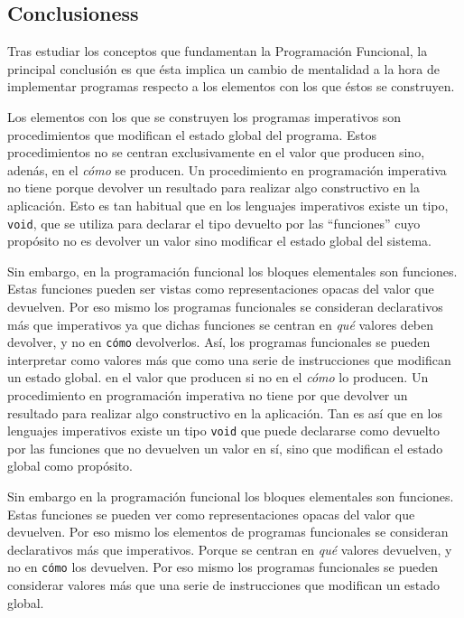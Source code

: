 \documentclass[../main.tex]{subfiles}
\begin{document}
\subsection{Conclusioness}
Tras estudiar los conceptos que fundamentan la Programación Funcional, la principal
conclusión es que ésta implica un cambio de mentalidad a la hora de implementar programas
respecto a los elementos con los que éstos se construyen.

Los elementos con los que se construyen los programas imperativos son procedimientos
que modifican el estado global del programa. Estos procedimientos no se centran exclusivamente
en el valor que producen sino, adenás, en el \textit{cómo} se producen. Un procedimiento en programación
imperativa no tiene porque devolver un resultado para realizar algo constructivo en la aplicación.
Esto es tan habitual que en los lenguajes imperativos existe un tipo, \texttt{void}, que se utiliza
para declarar el tipo devuelto por las ``funciones'' cuyo propósito no es devolver un valor sino  
modificar el estado global del sistema.

Sin embargo, en la programación funcional los bloques elementales son funciones. Estas
funciones pueden ser vistas como representaciones opacas del valor que devuelven. Por eso
mismo los programas funcionales se consideran declarativos más que imperativos ya que
dichas funciones se centran en \textit{qué} valores deben devolver, y no en \texttt{cómo} 
devolverlos. Así, los programas funcionales se pueden interpretar como valores más que como 
una serie de instrucciones que modifican un estado global.
en el valor que producen si no en el \textit{cómo} lo producen. Un procedimiento en programación
imperativa no tiene por que devolver un resultado para realizar algo constructivo en la aplicación.
Tan es así que en los lenguajes imperativos existe un tipo \texttt{void} que puede declararse
como devuelto por las funciones que no devuelven un valor en sí, sino que modifican el estado global
como propósito.

Sin embargo en la programación funcional los bloques elementales son funciones. Estas
funciones se pueden ver como representaciones opacas del valor que devuelven. Por eso
mismo los elementos de programas funcionales se consideran declarativos más que imperativos.
Porque se centran en \textit{qué} valores devuelven, y no en \texttt{cómo} los devuelven.
Por eso mismo los programas funcionales se pueden considerar valores más que una serie de
instrucciones que modifican un estado global.
\end{document}
